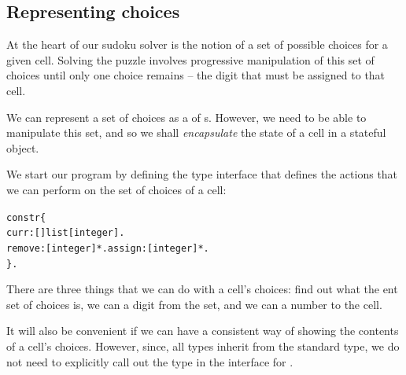 \subsection{Representing choices}
\label{su:choice}

At the heart of our sudoku solver is the notion of a set of possible choices for a given cell. Solving the puzzle involves progressive manipulation of this set of choices until only one choice remains -- the digit that must be assigned to that cell.

We can represent a set of choices as a  of s. However, we need to be able to manipulate this set, and so we shall \emph{encapsulate} the state of a cell in a stateful  object.

We start our program by defining the type interface that defines the actions that we can perform on the set of choices of a cell:
\begin{alltt}
constr \impl \{
  curr:[]\funarrow{}list[integer].
  remove:[integer]*. assign:[integer]*.
\}.
\end{alltt}
There are three things that we can do with a cell's choices: find out what the ent set of choices is, we can  a digit from the set, and we can  a number to the cell.

It will also be convenient if we can have a consistent way of showing the contents of a cell's choices. However, since, all types inherit from the standard  type, we do not need to explicitly call out the  type in the interface for .

